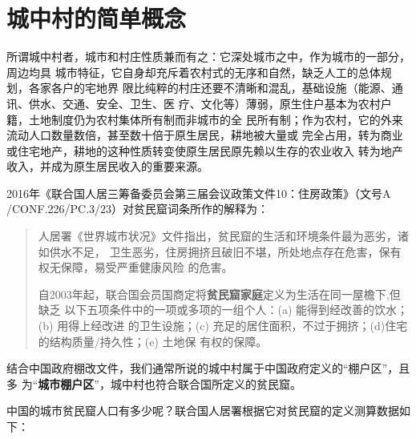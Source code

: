\chapter{城中村的简单概念}

所谓城中村者，城市和村庄性质兼而有之：它深处城市之中，作为城市的一部分，周边均具
城市特征，它自身却充斥着农村式的无序和自然，缺乏人工的总体规划，各家各户的宅地界
限比纯粹的村庄还要不清晰和混乱，基础设施（能源、通讯、供水、交通、安全、卫生、医
疗、文化等）薄弱，原生住户基本为农村户籍，土地制度仍为农村集体所有制而非城市的全
民所有制；作为农村，它的外来流动人口数量数倍，甚至数十倍于原生居民，耕地被大量或
完全占用，转为商业或住宅地产，耕地的这种性质转变使原生居民原先赖以生存的农业收入
转为地产收入，并成为原生居民收入的重要来源。

2016年《联合国人居三筹备委员会第三届会议政策文件10：住房政策》（文号A
/CONF.226/PC.3/23）对贫民窟词条所作的解释为：
\begin{quotation}
  人居署《世界城市状况》文件指出，贫民窟的生活和环境条件最为恶劣，诸如供水不足，
  卫生恶劣，住房拥挤且破旧不堪，所处地点存在危害，保有权无保障，易受严重健康风险
  的危害。

  自2003年起，联合国会员国商定将\textbf{贫民窟家庭}定义为生活在同一屋檐下,但缺乏
  以下五项条件中的一项或多项的一组个人：(a) 能得到经改善的饮水；(b) 用得上经改进
  的卫生设施；(c) 充足的居住面积，不过于拥挤；(d)住宅的结构质量/持久性；(e) 土地保
  有权的保障。
\end{quotation}

结合中国政府棚改文件，我们通常所说的城中村属于中国政府定义的“棚户区”，且多
为“\textbf{城市棚户区}”，城中村也符合联合国所定义的贫民窟。\cite{unandchina}


中国的城市贫民窟人口有多少呢？联合国人居署根据它对贫民窟的定义测算数据如下：
\begin{table}[!ht]
\centering
\caption{1990-2014年中国城市贫民窟人口比例及数量}
\label{my-label}
\end{table}

